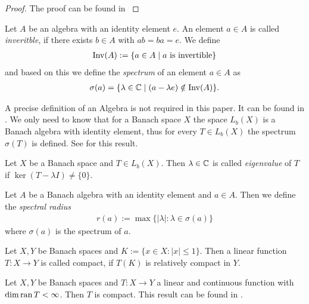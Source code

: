 \begin{proof}
	The proof can be found in \cite[p. 50]{FAna1}
\end{proof}

\begin{definition}
	Let $A$ be an algebra with an identity element $e$. An element $a \in A$ is called \textit{inveritble}, if there exists $b \in A$ with $ab = ba = e$. We define
	\begin{align*}
		\operatorname{Inv}(A) := \{a \in A \mid a \text{ is invertible}\}
	\end{align*}
	and based on this we define the \textit{spectrum} of an element $a \in A$ as
	\begin{align*}
		\sigma(a) = \{\lambda \in \mathbb{C} \mid (a - \lambda e) \notin \operatorname{Inv}(A)\}.
	\end{align*}
\end{definition}

\begin{remark}
	A precise definition of an Algebra is not required in this paper. It can be found in \cite[p. 122]{FAna1}. We only need to know that for a Banach space $X$ the space $L_b(X)$ is a Banach algebra with identity element, thus for every $T \in L_b(X)$ the spectrum $\sigma(T)$ is defined. See \cite[p.121-122]{FAna1} for this result. 
\end{remark}

\begin{definition}
	Let $X$ be a Banach space and $T \in L_b(X)$. Then $\lambda \in \mathbb{C}$ is called \textit{eigenvalue} of $T$ if $\ker(T - \lambda I) \neq \{0\}$. 
\end{definition}

\begin{definition}
	Let $A$ be a Banach algebra with an identity element and $a \in A$. Then we define the \textit{spectral radius}
	\begin{align*}
		r(a) := \max\{|\lambda| : \lambda \in \sigma(a)\}
	\end{align*}
	where $\sigma(a)$ is the spectrum of $a$.
\end{definition}

\begin{definition}
	Let $X, Y$ be Banach spaces and $K := \{x \in X: |x| \leq 1\}$. Then a linear function $T: X \to Y$ is called compact, if $T(K)$ is relatively compact in $Y$. 
\end{definition}

\begin{remark} \label{remark:compact}
	Let $X, Y$ be Banach spaces and $T:X \to Y$ a linear and continuous function with $\dim \operatorname{ran} T < \infty$. Then $T$ is compact. This result can be found in \cite[p. 133]{FAna1}.
\end{remark}

